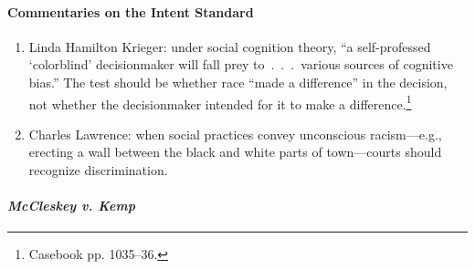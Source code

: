 \paragraph{Commentaries on the Intent Standard}

\begin{enumerate}
    \item Linda Hamilton Krieger: under social cognition theory, ``a 
    self-professed `colorblind' decisionmaker will fall prey to~.~.~.~various 
    sources of cognitive bias.'' The test should be whether race ``made a 
    difference'' in the decision, not whether the decisionmaker intended for 
    it to make a difference.\footnote{Casebook pp. 1035--36.}
    \item Charles Lawrence: when social practices convey unconscious 
    racism---e.g., erecting a wall between the black and white parts of 
    town---courts should recognize discrimination.
\end{enumerate}

\paragraph{\emph{McCleskey v. Kemp}}

